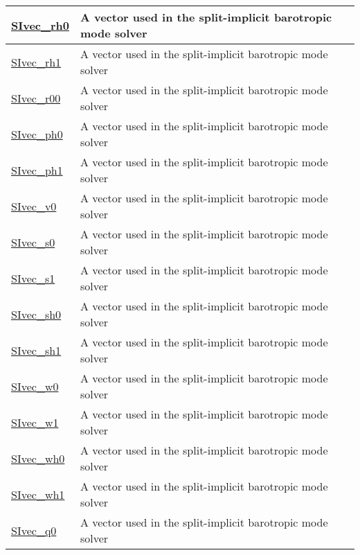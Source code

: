 {\begin{center}
\begin{longtable}{| p{2.0in} | p{4.0in} |}
    \hline
    \hyperref[subsec:var_sec_diagnostics_SIvec_rh0]{SIvec\_rh0} & A vector used in the split-implicit barotropic mode solver \\
    \hline
    \hyperref[subsec:var_sec_diagnostics_SIvec_rh1]{SIvec\_rh1} & A vector used in the split-implicit barotropic mode solver \\
    \hline
    \hyperref[subsec:var_sec_diagnostics_SIvec_r00]{SIvec\_r00} & A vector used in the split-implicit barotropic mode solver \\
    \hline
    \hyperref[subsec:var_sec_diagnostics_SIvec_ph0]{SIvec\_ph0} & A vector used in the split-implicit barotropic mode solver \\
    \hline
    \hyperref[subsec:var_sec_diagnostics_SIvec_ph1]{SIvec\_ph1} & A vector used in the split-implicit barotropic mode solver \\
    \hline
    \hyperref[subsec:var_sec_diagnostics_SIvec_v0]{SIvec\_v0} & A vector used in the split-implicit barotropic mode solver \\
    \hline
    \hyperref[subsec:var_sec_diagnostics_SIvec_s0]{SIvec\_s0} & A vector used in the split-implicit barotropic mode solver \\
    \hline
    \hyperref[subsec:var_sec_diagnostics_SIvec_s1]{SIvec\_s1} & A vector used in the split-implicit barotropic mode solver \\
    \hline
    \hyperref[subsec:var_sec_diagnostics_SIvec_sh0]{SIvec\_sh0} & A vector used in the split-implicit barotropic mode solver \\
    \hline
    \hyperref[subsec:var_sec_diagnostics_SIvec_sh1]{SIvec\_sh1} & A vector used in the split-implicit barotropic mode solver \\
    \hline
    \hyperref[subsec:var_sec_diagnostics_SIvec_w0]{SIvec\_w0} & A vector used in the split-implicit barotropic mode solver \\
    \hline
    \hyperref[subsec:var_sec_diagnostics_SIvec_w1]{SIvec\_w1} & A vector used in the split-implicit barotropic mode solver \\
    \hline
    \hyperref[subsec:var_sec_diagnostics_SIvec_wh0]{SIvec\_wh0} & A vector used in the split-implicit barotropic mode solver \\
    \hline
    \hyperref[subsec:var_sec_diagnostics_SIvec_wh1]{SIvec\_wh1} & A vector used in the split-implicit barotropic mode solver \\
    \hline
    \hyperref[subsec:var_sec_diagnostics_SIvec_q0]{SIvec\_q0} & A vector used in the split-implicit barotropic mode solver \\

\end{longtable}
\end{center}}
